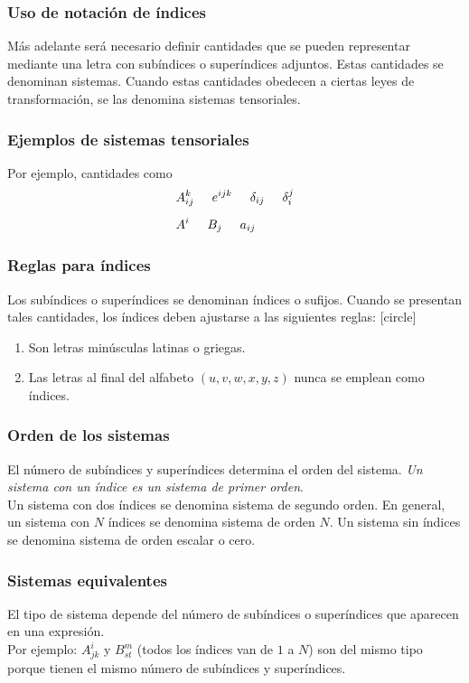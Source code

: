 \documentclass[12pt]{beamer}
\begin{document}
\begin{frame}
\frametitle{Uso de notación de índices}
Más adelante será necesario definir cantidades que se pueden representar mediante una letra con subíndices o superíndices adjuntos. Estas cantidades se denominan sistemas. Cuando estas cantidades obedecen a ciertas leyes de transformación, se las denomina sistemas tensoriales. 
\end{frame}
\begin{frame}
\frametitle{Ejemplos de sistemas tensoriales}
Por ejemplo, cantidades como
\begin{align*}
&A_{ij}^{k} \hspace{0.5cm} e^{ijk} \hspace{0.5cm} \delta_{ij} \hspace{0.5cm} \delta_{i}^{j} \\[0.5em]
&A^{i} \hspace{0.5cm} B_{j} \hspace{0.5cm} a_{ij}
\end{align*}
\end{frame}
\begin{frame}
\frametitle{Reglas para índices}
Los subíndices o superíndices se denominan índices o sufijos. Cuando se presentan tales cantidades, los índices deben ajustarse a las siguientes reglas:
[circle]
\begin{enumerate}[<+->]
\item Son letras minúsculas latinas o griegas.
\item Las letras al final del alfabeto $(u, v, w, x, y, z)$ nunca se emplean como índices.
\end{enumerate}
\end{frame}
\begin{frame}
\frametitle{Orden de los sistemas}
El número de subíndices y superíndices determina el orden del sistema. \emph{Un sistema con un índice es un sistema de primer orden}.
\\
\bigskip
\pause
Un sistema con dos índices se denomina sistema de segundo orden. En general, un sistema con $N$ índices se denomina sistema de orden $N$. \pause Un sistema sin índices se denomina sistema de orden escalar o cero.
\end{frame}
\begin{frame}
\frametitle{Sistemas equivalentes}
El tipo de sistema depende del número de subíndices o superíndices que aparecen en una expresión.
\\
\bigskip
\pause
Por ejemplo: $A_{jk}^{i}$ y $B_{st}^{m}$ (todos los índices van de $1$ a $N$) son del mismo tipo porque tienen el mismo número de subíndices y superíndices.
\end{frame}
\end{document}
